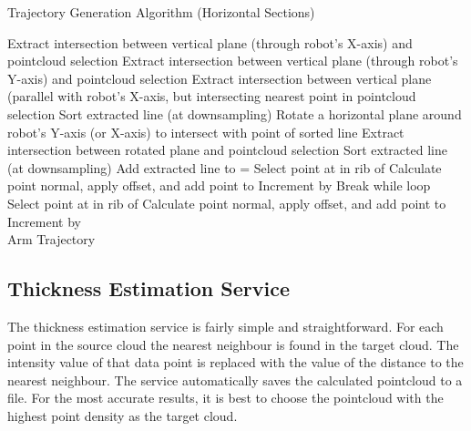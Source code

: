 \begin{spacing}{0.8}
\begin{algorithm}[H]
\caption{Trajectory Generation Algorithm (Horizontal Sections)}
\label{alg:trajh}
\begin{algorithmic}[1]
\begin{raggedright}
\State Extract intersection between vertical plane (through robot's X-axis) and pointcloud selection
\State Extract intersection between vertical plane (through robot's Y-axis) and pointcloud selection
\EndIf
{}
\State Extract intersection between vertical plane (parallel with robot's X-axis, but intersecting nearest point in pointcloud selection
\EndIf 
\State Sort extracted line (at  downsampling)
\State Rotate a horizontal plane around robot's Y-axis (or X-axis) to intersect with point  of sorted line
\State Extract intersection between rotated plane and pointcloud selection
\State Sort extracted line (at  downsampling)
\State Add extracted line to 
\EndFor
\State {} = 
\State Select point at  in rib  of 
\State Calculate point normal, apply offset, and add point to 
\EndFor
\State Increment  by 
\State Break while loop
\EndIf
{}
\State Select point at  in rib  of 
\State Calculate point normal, apply offset, and add point to 
\EndFor
\State Increment  by 
\EndWhile
\EndFunction\\
\Return Arm Trajectory
\end{raggedright}
\end{algorithmic}
\end{algorithm}
\end{spacing}
\subsection{Thickness Estimation Service}

The thickness estimation service is fairly simple and straightforward. For each point in the source cloud the nearest neighbour is found in the target cloud. The intensity value of that data point is replaced with the value of the distance to the nearest neighbour. The service automatically saves the calculated pointcloud to a file. For the most accurate results, it is best to choose the pointcloud with the highest point density as the target cloud.\\

